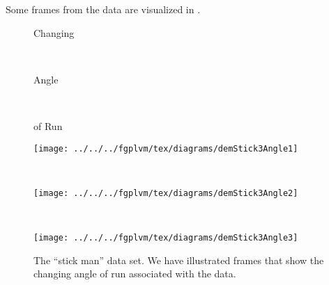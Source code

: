 Some frames from the data are visualized in .
\begin{figure}
  \begin{minipage}[b][0.8\textheight][t]{0.5\columnwidth}%
    \begin{minipage}[c][0.3\textheight]{1\columnwidth}%
      \begin{center}
        Changing
        \end{center}%
    \end{minipage}\\
    \begin{minipage}[c][0.3\textheight]{1\columnwidth}%
      \begin{center}
        Angle
        \end{center}%
    \end{minipage}\\
    \begin{minipage}[c][0.3\textheight]{1\columnwidth}%
      \begin{center}
        of Run
        \end{center}%
    \end{minipage}%
  \end{minipage}%
  \begin{minipage}[b][0.8\textheight][t]{0.5\columnwidth}%
    \begin{minipage}[t][0.3\textheight]{1\columnwidth}%
      \begin{center}
        \texttt{[image: ../../../fgplvm/tex/diagrams/demStick3Angle1]}
        \end{center}%
    \end{minipage}\\
    \begin{minipage}[t][0.3\textheight]{1\columnwidth}%
      \begin{center}
        \texttt{[image: ../../../fgplvm/tex/diagrams/demStick3Angle2]}
        \end{center}%
    \end{minipage}\\
    \begin{minipage}[t][0.3\textheight]{1\columnwidth}%
      \begin{center}
        \texttt{[image: ../../../fgplvm/tex/diagrams/demStick3Angle3]}
        \end{center}%
    \end{minipage}%
  \end{minipage}
  \caption{The ``stick man'' data set. We have illustrated frames
    that show the changing angle of run associated with the
    data.} \label{fig:stickManData}
  
\end{figure}

